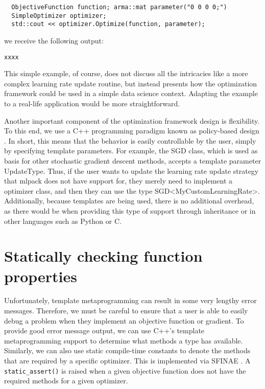 \documentclass{article}
\begin{document}
\vspace*{-0.4em}
\begin{verbatim}
  ObjectiveFunction function; arma::mat parameter("0 0 0 0;")
  SimpleOptimizer optimizer;
  std::cout << optimizer.Optimize(function, parameter);
\end{verbatim}
\vspace*{-0.4em}

we receive the following output:

\vspace*{-0.4em}
{\footnotesize
\begin{verbatim}
xxxx
\end{verbatim}
}
\vspace*{-0.4em}

This simple example, of course, does not discuss all the intricacies like a more
complex learning rate update routine, but instead presents how the optimization
framework could be used in a simple data science context. Adapting the example
to a real-life application would be more straightforward.

Another important component of the optimization framework design is flexibility.
To this end, we use a C++ programming paradigm known as policy-based design
\cite{Alexandrescu2001}. In short, this means that the behavior is easily
controllable by the user, simply by specifying template parameters. For example,
the SGD class, which is used as basis for other stochastic gradient descent
methods, accepts a template parameter UpdateType. Thus, if the user wants to
update the learning rate update strategy that mlpack does not have support for,
they merely need to implement a optimizer class, and then they can use the type
SGD<MyCustomLearningRate>. Additionally, because templates are being used, there
is no additional overhead, as there would be when providing this type of support
through inheritance or in other languages such as Python or C.

\section{Statically checking function properties}
\label{sec:static}

Unfortunately, template metaprogramming can result in some very lengthy error
messages.  Therefore, we must be careful to ensure that a user is able to easily
debug a problem when they implement an objective function or gradient.  To
provide good error message output, we can use C++'s template metaprogramming
support to determine what methods a type has available.  Similarly, we can also
use static compile-time constants to denote the methods that are required by a
specific optimizer.  This is implemented via SFINAE \cite{sfinae}.  A {\tt
static\_assert()} is raised when a given objective function does not have the
required methods for a given optimizer.
\end{document}
